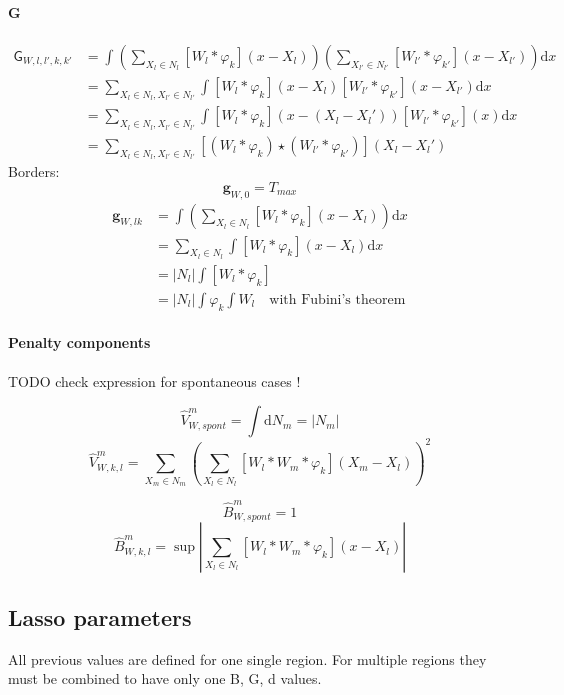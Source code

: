 \documentclass[a4paper,10pt]{article}
\newcommand\D{\mathrm{d}}
\newcommand\Convolution{\ast}
\newcommand\Correlation{\star}
\begin{document}
\paragraph{G}
\[ \begin{split}
    \mathsf{G}_{W,l,l',k,k'}
    & = \int \left( \sum_{X_l \in N_l} [W_l \Convolution \varphi_k](x-X_l) \right) \left( \sum_{X_{l'} \in N_{l'}} [W_{l'} \Convolution \varphi_{k'}](x-X_{l'}) \right) \D x \\
    & = \sum_{X_l \in N_l, X_{l'} \in N_{l'}} \int [W_l \Convolution \varphi_k](x-X_l) [W_{l'} \Convolution \varphi_{k'}](x-X_{l'}) \D x \\
    & = \sum_{X_l \in N_l, X_{l'} \in N_{l'}} \int [W_l \Convolution \varphi_k](x-(X_l-X_l')) [W_{l'} \Convolution \varphi_{k'}](x) \D x \\
    & = \sum_{X_l \in N_l, X_{l'} \in N_{l'}} [(W_l \Convolution \varphi_k) \Correlation (W_{l'} \Convolution \varphi_{k'})] (X_l-X_l')
\end{split} \]
Borders:
\[ \mathbf{g}_{W,0} = T_{max} \]
\[ \begin{split} \mathbf{g}_{W,lk}
    & = \int \left( \sum_{X_l \in N_l} [W_l \Convolution \varphi_k](x - X_l) \right) \D x \\
    & = \sum_{X_l \in N_l} \int [W_l \Convolution \varphi_k](x - X_l) \D x \\
    & = |N_l| \int [W_l \Convolution \varphi_k] \\
    & = |N_l| \int \varphi_k \int W_l \quad \text{with Fubini's theorem}
\end{split} \]

\paragraph{Penalty components}
TODO check expression for spontaneous cases !

\[ \widehat{V}_{W,spont}^m = \int \D N_m = |N_m| \]
\[ \widehat{V}_{W,k,l}^m = \sum_{X_m \in N_m} \left( \sum_{X_l \in N_l} [W_l \Convolution W_m \Convolution \varphi_k](X_m-X_l) \right)^2 \]

\[ \widehat{B}_{W,spont}^m = 1 \]
\[ \widehat{B}_{W,k,l}^m = \sup |\sum_{X_l \in N_l} [W_l \Convolution W_m \Convolution \varphi_k](x - X_l)| \]

\subsection{Lasso parameters}

All previous values are defined for one single region.
For multiple regions they must be combined to have only one B, G, d values.
\end{document}
